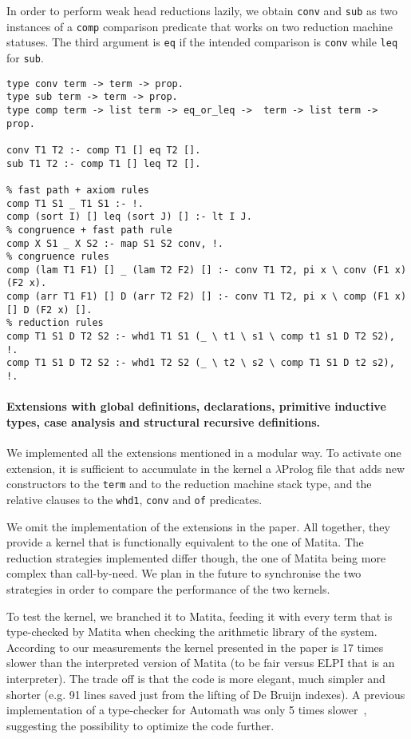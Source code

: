 In order to perform weak head reductions lazily, we obtain \verb+conv+ and \verb+sub+ as two instances of a \verb+comp+ comparison predicate that works on two reduction machine statuses. The third argument is \verb+eq+ if the intended comparison is \verb+conv+ while \verb+leq+ for \verb+sub+.
\begin{Verbatim}
type conv term -> term -> prop.
type sub term -> term -> prop.
type comp term -> list term -> eq_or_leq ->  term -> list term -> prop.

conv T1 T2 :- comp T1 [] eq T2 [].
sub T1 T2 :- comp T1 [] leq T2 [].

% fast path + axiom rules
comp T1 S1 _ T1 S1 :- !.
comp (sort I) [] leq (sort J) [] :- lt I J.
% congruence + fast path rule
comp X S1 _ X S2 :- map S1 S2 conv, !.
% congruence rules
comp (lam T1 F1) [] _ (lam T2 F2) [] :- conv T1 T2, pi x \ conv (F1 x) (F2 x).
comp (arr T1 F1) [] D (arr T2 F2) [] :- conv T1 T2, pi x \ comp (F1 x) [] D (F2 x) [].
% reduction rules
comp T1 S1 D T2 S2 :- whd1 T1 S1 (_ \ t1 \ s1 \ comp t1 s1 D T2 S2), !.
comp T1 S1 D T2 S2 :- whd1 T2 S2 (_ \ t2 \ s2 \ comp T1 S1 D t2 s2), !.
\end{Verbatim}

\paragraph{Extensions with global definitions, declarations, primitive inductive types, case analysis and structural recursive definitions.}
We implemented all the extensions mentioned in a modular way. To activate one extension, it is sufficient to accumulate in the kernel a $\lambda$Prolog file that adds new constructors to the \verb+term+ and to the reduction machine stack type, and the relative clauses to the \verb+whd1+, \verb+conv+ and \verb+of+ predicates.

We omit the implementation of the extensions in the paper. All together, they provide a kernel that is functionally equivalent to the one of Matita. The reduction strategies implemented differ though, the one of Matita being more complex than call-by-need. We plan in the future to synchronise the two strategies in order to compare the performance of the two kernels.

To test the kernel, we branched it to Matita, feeding it with every term that is type-checked by Matita when checking the arithmetic library of the system.
According to our measurements the kernel presented in the paper is 17 times slower than the interpreted version of Matita (to be fair versus ELPI that is an interpreter). The trade off is that the code is more elegant, much simpler and shorter (e.g. 91 lines saved just from the lifting of De Bruijn indexes). A previous implementation of a type-checker for Automath was only 5 times slower~\cite{elpiLPAR}, suggesting the possibility to optimize the code further.
